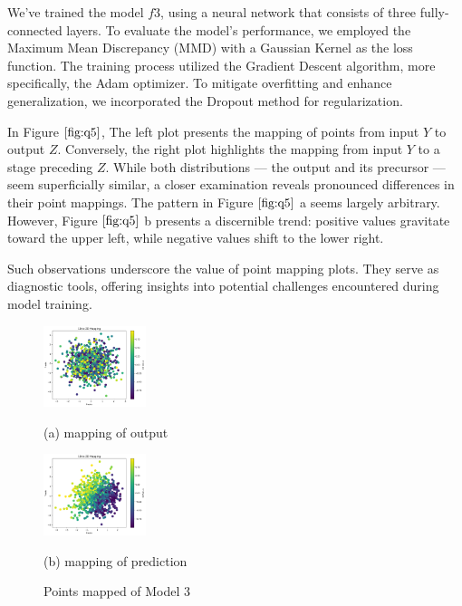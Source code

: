 \documentclass{article}
\begin{document}
We've trained the model $f3$, using a neural network that consists of three fully-connected layers. To evaluate the model's performance, we employed the Maximum Mean Discrepancy (MMD) with a Gaussian Kernel as the loss function. The training process utilized the Gradient Descent algorithm, more specifically, the Adam optimizer. To mitigate overfitting and enhance generalization, we incorporated the Dropout method for regularization.

In Figure $\ref{fig:q5}$, The left plot presents the mapping of points from input 
$Y$ to output $Z$.
Conversely, the right plot highlights the mapping from input 
$Y$ to a stage preceding $Z$.
While both distributions — the output and its precursor — seem superficially similar, a closer examination reveals pronounced differences in their point mappings. The pattern in 
Figure $\ref{fig:q5}$ a seems largely arbitrary. However, 
Figure $\ref{fig:q5}$ b presents a discernible trend: positive values gravitate toward the upper left, while negative values shift to the lower right.

Such observations underscore the value of point mapping plots. They serve as diagnostic tools, offering insights into potential challenges encountered during model training.



\begin{figure}[htb]
  \begin{minipage}[a]{.48\linewidth}
    \centering
    \centerline{\includegraphics[width=3.0cm]{images/q5_1}}
    \centerline{(a) mapping of output}\medskip
  \end{minipage}
  \hfill
  \begin{minipage}[c]{0.48\linewidth}
    \centering
    \centerline{\includegraphics[width=3.0cm]{images/q5_2}}
    \centerline{(b) mapping of prediction}\medskip
  \end{minipage}
  \caption{Points mapped of Model 3}
  \label{fig:q5}
  \end{figure}
\end{document}
